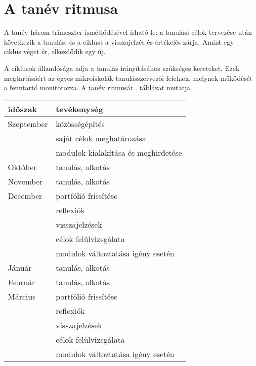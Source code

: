\section{A tanév ritmusa}

A tanév három trimeszter ismétlődésével írható le: a tanulási célok
tervezése után következik a tanulás, és a ciklust a visszajelzés és értékelés
zárja.	Amint egy ciklus véget ér, elkezdődik egy új.

A ciklusok állandósága adja a tanulás irányításához szükséges kereteket. Ezek
megtartásáért az egyes mikroiskolák tanulásszervezői felelnek, melynek működését a
fenntartó monitorozza. A tanév ritmusát . táblázat
mutatja.

\begin{table}
  \centering
  \begin{tabular}{ l|l }
    \textbf{időszak} & \textbf{tevékenység}                \\
    \hline
    Szeptember       &
    közösségépítés                                         \\
                     & saját célok meghatározása           \\
                     & modulok kialakítása és meghirdetése
    \\ \hline

    Október          &
    tanulás, alkotás
    \\ \hline

    November         &
    tanulás, alkotás
    \\ \hline

    December         &
    portfólió frissítése                                   \\
                     & reflexiók                           \\
                     & visszajelzések                      \\
                     & célok felülvizsgálata               \\
                     & modulok változtatása igény esetén
    \\ \hline

    Jánuár           &
    tanulás, alkotás
    \\ \hline

    Február          &
    tanulás, alkotás
    \\ \hline

    Március          &
    portfólió frissítése                                   \\
                     & reflexiók                           \\
                     & visszajelzések                      \\
                     & célok felülvizsgálata               \\
                     & modulok változtatása igény esetén
    \\ \hline


\end{tabular}
\end{table}
